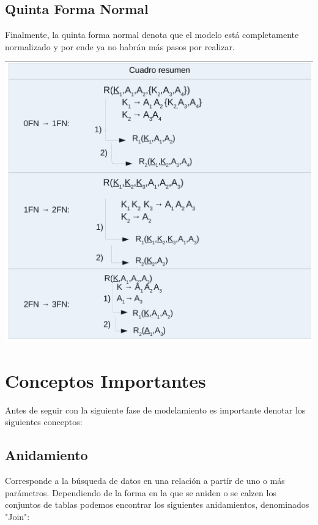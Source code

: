 \documentclass[12pt]{article}
\begin{document}
\subsection{Quinta Forma Normal}
Finalmente, la quinta forma normal denota que el modelo está completamente normalizado y por
ende ya no habrán más pasos por realizar.
\begin{center}
\includegraphics[scale=0.25]{cuadro_resumen.png}
\end{center}

\newpage

\section*{Conceptos Importantes}
Antes de seguir con la siguiente fase de modelamiento es importante denotar los siguientes
conceptos:

\subsection*{Anidamiento}
Corresponde a la búsqueda de datos en una relación a partír de uno o más parámetros. Dependiendo
de la forma en la que se aniden o se calzen los conjuntos de tablas podemos encontrar los siguientes
anidamientos, denominados "Join":
\end{document}
